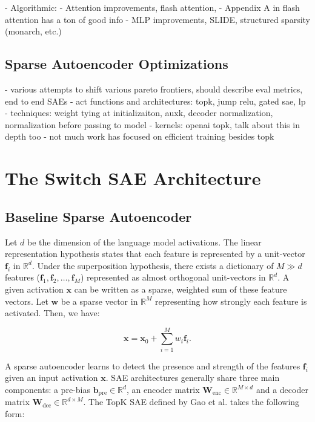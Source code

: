 \documentclass{article} %
\begin{document}
- Algorithmic: 
    - Attention improvements, flash attention, 
    - Appendix A in flash attention has a ton of good info
    - MLP improvements, SLIDE, structured sparsity (monarch, etc.)


\subsection{Sparse Autoencoder Optimizations}

- various attempts to shift various pareto frontiers, should describe eval metrics, end to end SAEs
- act functions and architectures: topk, jump relu, gated sae, lp
- techniques: weight tying at initializaiton, auxk, decoder normalization, normalization before passing to model
- kernels: openai topk, talk about this in depth too
- not much work has focused on efficient training besides topk

\section{The Switch SAE Architecture}

\subsection{Baseline Sparse Autoencoder}
Let \( d \) be the dimension of the language model activations. The linear representation hypothesis states that each feature is represented by a unit-vector \( \mathbf{f}_i \) in \( \mathbb{R}^d \). Under the superposition hypothesis, there exists a dictionary of \( M \gg d \) features (\( \mathbf{f}_1, \mathbf{f}_2, \ldots, \mathbf{f}_M \)) represented as almost orthogonal unit-vectors in \( \mathbb{R}^d \). A given activation \( \mathbf{x} \) can be written as a sparse, weighted sum of these feature vectors. Let \( \mathbf{w} \) be a sparse vector in \( \mathbb{R}^M \) representing how strongly each feature is activated. Then, we have:

\begin{equation}
\mathbf{x} = \mathbf{x}_0 + \sum_{i=1}^{M} w_i \mathbf{f}_i.
\end{equation}

A sparse autoencoder learns to detect the presence and strength of the features \( \mathbf{f}_i \) given an input activation \( \mathbf{x} \). SAE architectures generally share three main components: a pre-bias \( \mathbf{b}_{\text{pre}} \in \mathbb{R}^d \), an encoder matrix \( \mathbf{W}_{\text{enc}} \in \mathbb{R}^{M \times d} \) and a decoder matrix \( \mathbf{W}_{\text{dec}} \in \mathbb{R}^{d \times M} \). The TopK SAE defined by Gao et al. takes the following form:
\end{document}
